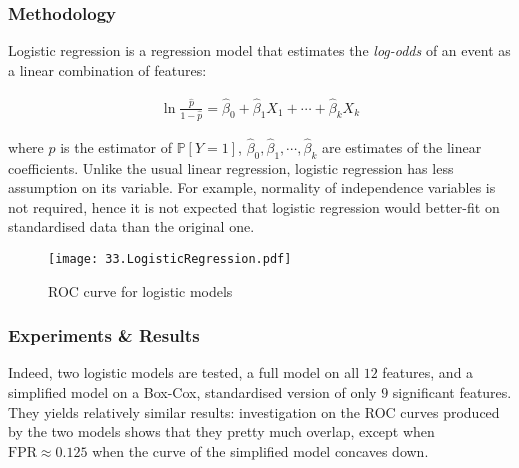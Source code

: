 

\subsubsection{Methodology}

Logistic regression is a regression model that estimates the \textit{log-odds} of an event as a linear combination of features:

\begin{align*}
    \ln \frac{\hat p}{1 - \hat p} = \hat\beta_0 + \hat\beta_1 X_1 + \cdots + \hat\beta_k X_k
\end{align*}

where \( \hat p \) is the estimator of \( \mathbb P[Y = 1] \), \( \hat\beta_0, \hat\beta_1, \cdots, \hat\beta_k \) are estimates of the linear coefficients. Unlike the usual linear regression, logistic regression has less assumption on its variable. For example, normality of independence variables is not required, hence it is not expected that logistic regression would better-fit on standardised data than the original one.

\begin{figure}[h]
    \texttt{[image: 33.LogisticRegression.pdf]}
    \caption{\centering ROC curve for logistic models}
\end{figure}

\subsubsection{Experiments \& Results}
Indeed, two logistic models are tested, a full model on all \( 12 \) features, and a simplified model on a Box-Cox, standardised version of only \( 9 \) significant features. They yields relatively similar results: investigation on the ROC curves produced by the two models shows that they pretty much overlap, except when \( \textrm{FPR} \approx 0.125 \) when the curve of the simplified model concaves down.

    
